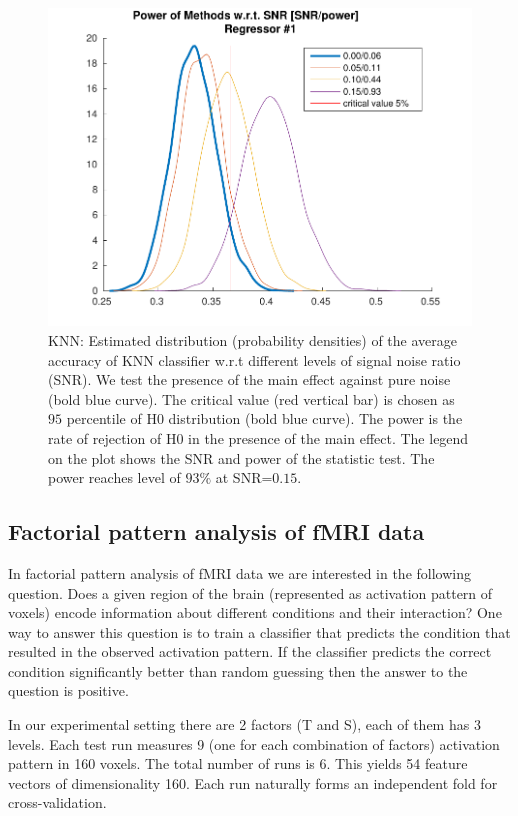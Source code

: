 \begin{figure}[t]\centering
\includegraphics{sample_knn_conv_1}  
\caption{KNN: Estimated distribution (probability densities) of the average accuracy of KNN classifier w.r.t different levels of signal noise ratio (SNR). We test the presence of the main effect against pure noise (bold blue curve). The critical value (red vertical bar) is chosen as $95$ percentile of H0 distribution (bold blue curve). The power is the rate of rejection of H0 in the presence of the main effect. The legend on the plot shows the SNR and power of the statistic test. The power reaches level of $93\%$ at SNR=$0.15$.}\label{fig:knn convergence}
\end{figure}

\subsection{Factorial pattern analysis of fMRI data}

In factorial pattern analysis of fMRI data we are interested in the following question. Does a given region of the brain (represented as activation pattern of voxels) encode information about different conditions and their interaction? One way to answer this question is to train a classifier that predicts the condition that resulted in the observed activation pattern. If the classifier predicts the correct condition significantly better than random guessing then the answer to the question is positive.

In our experimental setting there are 2 factors (T and S), each of them has 3 levels. Each test run measures 9 (one for each combination of factors) activation pattern in 160 voxels. The total number of runs is 6. This yields 54 feature vectors of dimensionality 160. Each run naturally forms an independent fold for cross-validation.


